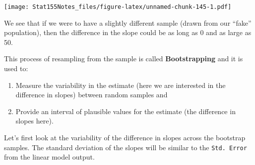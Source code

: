\documentclass[]{book}
\newenvironment{Shaded}{\begin{snugshade}}{\end{snugshade}}
\newcommand{\CommentTok}[1]{\textcolor[rgb]{0.56,0.35,0.01}{\textit{#1}}}
\newcommand{\DataTypeTok}[1]{\textcolor[rgb]{0.13,0.29,0.53}{#1}}
\newcommand{\DecValTok}[1]{\textcolor[rgb]{0.00,0.00,0.81}{#1}}
\newcommand{\KeywordTok}[1]{\textcolor[rgb]{0.13,0.29,0.53}{\textbf{#1}}}
\newcommand{\NormalTok}[1]{#1}
\newcommand{\OperatorTok}[1]{\textcolor[rgb]{0.81,0.36,0.00}{\textbf{#1}}}
\newcommand{\StringTok}[1]{\textcolor[rgb]{0.31,0.60,0.02}{#1}}
\providecommand{\tightlist}{%
  \setlength{\itemsep}{0pt}\setlength{\parskip}{0pt}}
\begin{document}
\begin{Shaded}
\end{Shaded}

\texttt{[image: Stat155Notes\_files/figure-latex/unnamed-chunk-145-1.pdf]}

We see that if we were to have a slightly different sample (drawn from our ``fake'' population), then the difference in the slope could be as long as 0 and as large as 50.

This process of resampling from the sample is called \textbf{Bootstrapping} and it is used to:

\begin{enumerate}
\def\labelenumi{\arabic{enumi}.}
\tightlist
\item
  Measure the variability in the estimate (here we are interested in the difference in slopes) between random samples and
\item
  Provide an interval of plausible values for the estimate (the difference in slopes here).
\end{enumerate}

Let's first look at the variability of the difference in slopes across the bootstrap samples. The standard deviation of the slopes will be similar to the \texttt{Std.\ Error} from the linear model output.

\begin{Shaded}
\end{Shaded}
\end{document}

